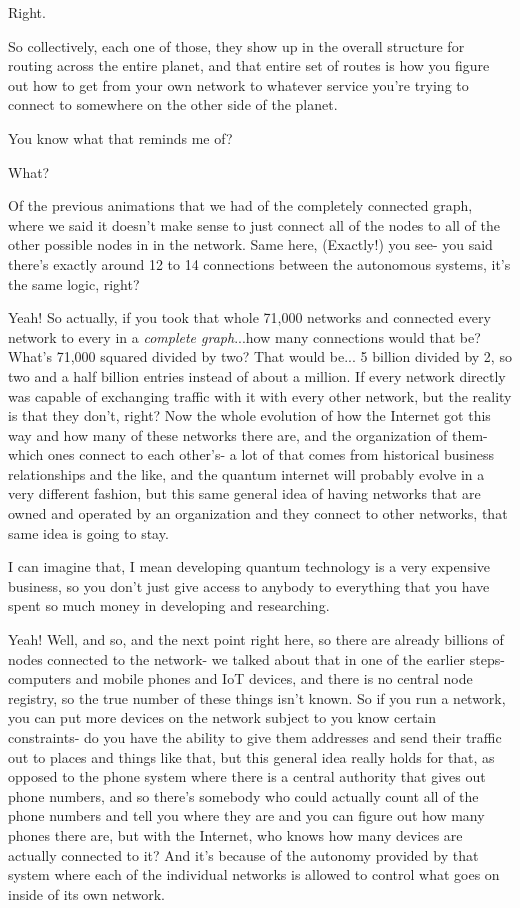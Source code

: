 \mmm Right.

\rrr So collectively, each one of those, they show up in the overall structure for routing across the entire planet, and that entire set of routes is how you figure out how to get from your own network to whatever service you're trying to connect to somewhere on the other side of the planet.

\mmm You know what that reminds me of? 

\rrr What?

\mmm Of the previous animations that we had of the completely connected graph, where we said it doesn't make sense to just connect all of the nodes to all of the other possible nodes in in the network. Same here, (Exactly!) you see- you said there's exactly around 12 to 14 connections between the autonomous systems, it's the same logic, right?

\rrr Yeah! So actually, if you took that whole 71,000 networks and connected every network to every in a \emph{complete graph}...how many connections would that be?  What's 71,000 squared divided by two? That would be... 5 billion divided by 2, so two and a half billion entries instead of about a million. If every network directly was capable of exchanging traffic with it with every other network, but the reality is that they don't, right? Now the whole evolution of how the Internet got this way and how many of these networks there are, and the organization of them- which ones connect to each other's- a lot of that comes from historical business relationships and the like, and the quantum internet will probably evolve in a very different fashion, but this same general idea of having networks that are owned and operated by an organization and they connect to other networks, that same idea is going to stay.

\mmm I can imagine that, I mean developing quantum technology is a very expensive business, so you don't just give access to anybody to everything that you have spent so much money in developing and researching.

\rrr Yeah! Well, and so, and the next point right here, so there are already billions of nodes connected to the network- we talked about that in one of the earlier steps- computers and mobile phones and IoT devices, and there is no central node registry, so the true number of these things isn't known. So if you run a network, you can put more devices on the network subject to you know certain constraints- do you have the ability to give them addresses and send their traffic out to places and things like that, but this general idea really holds for that, as opposed to the phone system where there is a central authority that gives out phone numbers, and so there's somebody who could actually count all of the phone numbers and tell you where they are and you can figure out how many phones there are, but with the Internet, who knows how many devices are actually connected to it? And it's because of the autonomy provided by that system where each of the individual networks is allowed to control what goes on inside of its own network.

